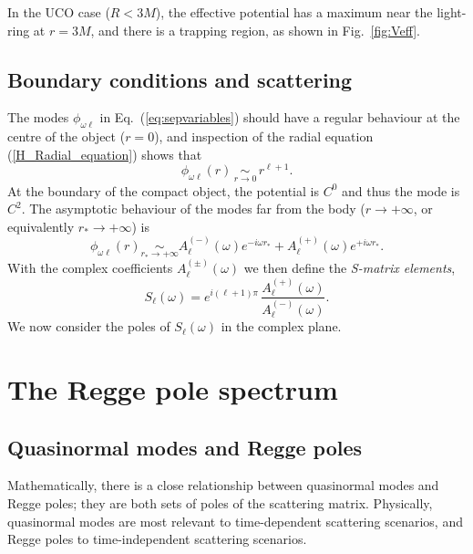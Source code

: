 \documentclass[aps,prd,longbibliography,reprint,twocolumn,amsmath,amssymb,amsfonts,showpacs,footnote,superscriptaddress]{revtex4-1}%
\begin{document}
In the UCO case ($R < 3M$), the effective potential has a maximum near the light-ring at $r=3M$, and there is a trapping region, as shown in Fig.~\ref{fig:Veff}.

\subsection{Boundary conditions and scattering}\label{subsec:bc}
The modes $\phi_{\omega \ell}$ in Eq.~(\ref{eq:sepvariables}) should have a regular behaviour at the centre of the object ($r = 0$), and inspection of the radial equation (\ref{H_Radial_equation}) shows that
\begin{equation}\label{bc_1_in}
\phi_{\omega  \ell}(r) \, \scriptstyle{\underset{r \to 0}{\sim}} \,
\displaystyle{r^{\ell+1}}.
\end{equation}
At the boundary of the compact object, the potential is $C^0$ and thus the mode is $C^2$.
The asymptotic behaviour of the modes far from the body ($r \to +\infty$, or equivalently $r_\ast \to +\infty$) is
\begin{equation}\label{bc_2_in}
\phi_{\omega  \ell}(r) \scriptstyle{\underset{r_\ast \to +\infty}{\sim}}
\displaystyle{ A^{(-)}_\ell (\omega) e^{-i\omega r_\ast} + A^{(+)}_\ell (\omega) e^{+i\omega r_\ast}}.
\end{equation}
With the complex coefficients $A^{(\pm)}_\ell (\omega)$ we then define the \emph{S-matrix elements},
\begin{equation}\label{Matrix_S}
  S_{\ell}(\omega) =  e^{i(\ell+1)\pi} \, \frac{A_{\ell}^{(+)}(\omega)}{A_{\ell}^{(-)}(\omega)}.
\end{equation}
We now consider the poles of $S_{\ell}(\omega)$ in the complex plane.


\section{The Regge pole spectrum}\label{sec:RP}

 \subsection{Quasinormal modes and Regge poles}\label{subsec:QNMs_RPs}
 Mathematically, there is a close relationship between quasinormal modes and Regge poles; they are both sets of poles of the scattering matrix. Physically, quasinormal modes are most relevant to time-dependent scattering scenarios, and Regge poles to time-independent scattering scenarios.
\end{document}
